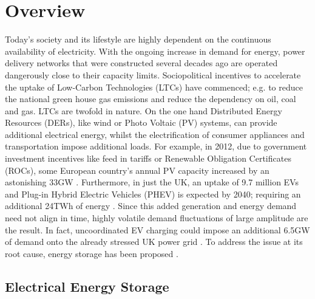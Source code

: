 \section{Overview}
\label{ch-introduction:sec:overview}

Today's society and its lifestyle are highly dependent on the continuous availability of electricity.
With the ongoing increase in demand for energy, power delivery networks that were constructed several decades ago are operated dangerously close to their capacity limits.
Sociopolitical incentives to accelerate the uptake of Low-Carbon Technologies (LTCs) have commenced; e.g. to reduce the national green house gas emissions and reduce the dependency on oil, coal and gas.
LTCs are twofold in nature.
On the one hand Distributed Energy Resources (DERs), like wind or Photo Voltaic (PV) systems, can provide additional electrical energy, whilst the electrification of consumer appliances and transportation impose additional loads.
For example, in 2012, due to government investment incentives like feed in tariffs or Renewable Obligation Certificates (ROCs), some European country's annual PV capacity increased by an astonishing 33GW \cite{Hockenos2013}.
Furthermore, in just the UK, an uptake of 9.7 million EVs and Plug-in Hybrid Electric Vehicles (PHEV) is expected by 2040; requiring an additional 24TWh of energy \cite{DBER2008, FES2015}.
Since this added generation and energy demand need not align in time, highly volatile demand fluctuations of large amplitude are the result.
In fact, uncoordinated EV charging could impose an additional 6.5GW of demand onto the already stressed UK power grid \cite{FES2016}.
To address the issue at its root cause, energy storage has been proposed \cite{Manz2012}.

\subsection{Electrical Energy Storage}

